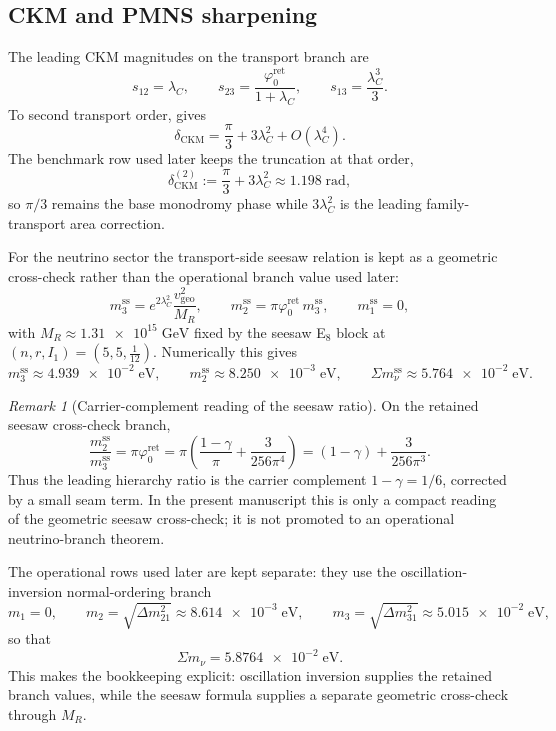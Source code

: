 \documentclass[11pt,a4paper]{article}
\theoremstyle{definition}
\theoremstyle{remark}
\newtheorem*{remark}{Remark}
\newcommand{\phiz}{\varphi_0^{\mathrm{ret}}}
\newcommand{\vgeo}{v_{\mathrm{geo}}}
\begin{document}
\subsection{CKM and PMNS sharpening}

The leading CKM magnitudes on the transport branch are
\begin{equation}
\label{eq:ckm-magnitudes}
s_{12}=\lambda_C,
\qquad
s_{23}=\frac{\phiz}{1+\lambda_C},
\qquad
s_{13}=\frac{\lambda_C^3}{3}.
\end{equation}
To second transport order,  gives
\begin{equation}
\label{eq:ckm-phase}
\delta_{\mathrm{CKM}}=\frac{\pi}{3}+3\lambda_C^2+O(\lambda_C^4).
\end{equation}
The benchmark row used later keeps the truncation at that order,
\[
\delta_{\mathrm{CKM}}^{(2)}
:=
\frac{\pi}{3}+3\lambda_C^2
\approx
\num{1.198}\;\mathrm{rad},
\]
so $\pi/3$ remains the base monodromy phase while $3\lambda_C^2$ is the leading family-transport area correction.

For the neutrino sector the transport-side seesaw relation is kept as a geometric cross-check rather than the operational branch value used later:
\begin{equation}
\label{eq:neutrino-masses}
m_3^{\mathrm{ss}}=e^{2\lambda_C^2}\frac{\vgeo^2}{M_R},
\qquad
m_2^{\mathrm{ss}}=\pi\phiz\,m_3^{\mathrm{ss}},
\qquad
m_1^{\mathrm{ss}}=0,
\end{equation}
with $M_R\approx\num{1.31e15}\;\mathrm{GeV}$ fixed by the seesaw E$_8$ block at $(n,r,I_1)=(5,5,\frac{1}{12})$. Numerically this gives
\[
\!m_3^{\mathrm{ss}}\approx\num{4.939e-2}\;\mathrm{eV},
\qquad
\!m_2^{\mathrm{ss}}\approx\num{8.250e-3}\;\mathrm{eV},
\qquad
\Sigma m_\nu^{\mathrm{ss}}\approx\num{5.764e-2}\;\mathrm{eV}.
\]
\begin{remark}[Carrier-complement reading of the seesaw ratio]
On the retained seesaw cross-check branch,
\[
\frac{m_2^{\mathrm{ss}}}{m_3^{\mathrm{ss}}}
=
\pi\phiz
=
\pi\!\left(\frac{1-\gamma}{\pi}+\frac{3}{256\pi^4}\right)
=
(1-\gamma)+\frac{3}{256\pi^3}.
\]
Thus the leading hierarchy ratio is the carrier complement $1-\gamma=1/6$, corrected by a small seam term. In the present manuscript this is only a compact reading of the geometric seesaw cross-check; it is not promoted to an operational neutrino-branch theorem.
\end{remark}
The operational rows used later are kept separate: they use the oscillation-inversion normal-ordering branch
\[
m_1=0,
\qquad
m_2=\sqrt{\Delta m_{21}^2}\approx\num{8.614e-3}\;\mathrm{eV},
\qquad
m_3=\sqrt{\Delta m_{31}^2}\approx\num{5.015e-2}\;\mathrm{eV},
\]
so that
\[
\Sigma m_\nu=\num{5.8764e-2}\;\mathrm{eV}.
\]
This makes the bookkeeping explicit: oscillation inversion supplies the retained branch values, while the seesaw formula supplies a separate geometric cross-check through $M_R$.
\end{document}
